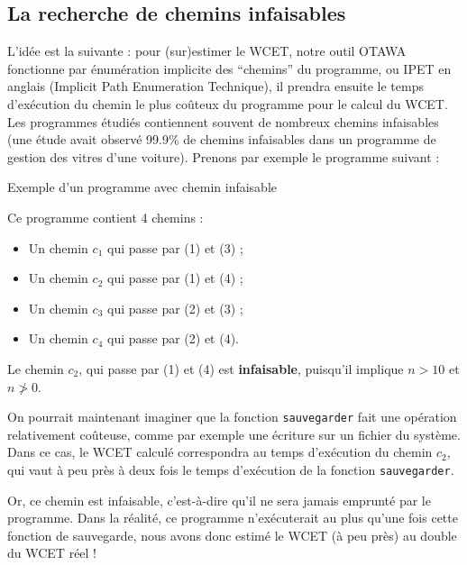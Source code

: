 \documentclass[french]{article}
\begin{document}
  \subsection{La recherche de chemins infaisables}
  L'idée est la suivante : pour (sur)estimer le WCET, notre outil OTAWA fonctionne par énumération implicite des ``chemins'' du programme, ou IPET en anglais (Implicit Path Enumeration Technique), il prendra ensuite le temps d'exécution du chemin le plus coûteux du programme pour le calcul du WCET. Les programmes étudiés contiennent souvent de nombreux chemins infaisables (une étude avait observé 99.9\% de chemins infaisables dans un programme de gestion des vitres d'une voiture). Prenons par exemple le programme suivant :
  
  \begin{algorithm}
    \label{alg:1}
    \caption{Exemple d'un programme avec chemin infaisable}
  \end{algorithm}
  
  Ce programme contient 4 chemins :
  \begin{itemize}
    \item Un chemin $c_1$ qui passe par (1) et (3) ;
    \item Un chemin $c_2$ qui passe par (1) et (4) ;
    \item Un chemin $c_3$ qui passe par (2) et (3) ;
    \item Un chemin $c_4$ qui passe par (2) et (4).
  \end{itemize}
  
  Le chemin $c_2$, qui passe par (1) et (4) est \textbf{infaisable}, puisqu'il implique $n > 10$ et $n \ngtr 0$.
  
  On pourrait maintenant imaginer que la fonction \texttt{sauvegarder} fait une opération relativement coûteuse, comme par exemple une écriture sur un fichier du système. Dans ce cas, le WCET calculé correspondra au temps d'exécution du chemin $c_2$, qui vaut à peu près à deux fois le temps d'exécution de la fonction \texttt{sauvegarder}.
  
  Or, ce chemin est infaisable, c'est-à-dire qu'il ne sera jamais emprunté par le programme. Dans la réalité, ce programme n'exécuterait au plus qu'une fois cette fonction de sauvegarde, nous avons donc estimé le WCET (à peu près) au double du WCET réel !
  
\end{document}
